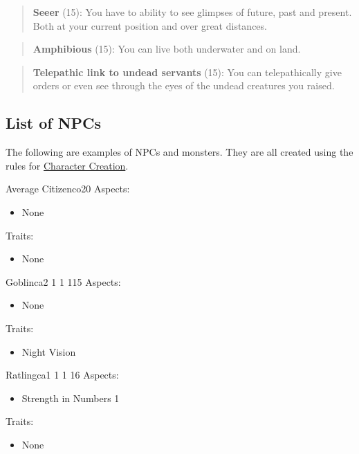 \documentclass[11pt]{article}
\begin{document}
{\begin{quote}
\textbf{Seeer} (15): You have to ability to see glimpses of future, past and present. Both at your current position and over great distances. 
\end{quote}

\begin{quote}
\textbf{Amphibious} (15): You can live both underwater and on land.
\end{quote}

\begin{quote}
\textbf{Telepathic link to undead servants} (15): You can telepathically give orders or even see through the eyes of the undead creatures you raised. 
\end{quote}
\subsection{List of NPCs}
\label{sec:org2c83388}
The following are examples of NPCs and monsters. They are all created using the rules for \hyperref[sec:org7863b9b]{Character Creation}. 

\begin{npc}{Average Citizen}{co}{2}{0}
Aspects:
\begin{itemize}
\item None
\end{itemize}
Traits:
\begin{itemize}
\item None
\end{itemize}
\end{npc}

\begin{npc}{Goblin}{ca}{2 1 1 1}{15}
Aspects:
\begin{itemize}
\item None
\end{itemize}
Traits:
\begin{itemize}
\item Night Vision
\end{itemize}
\end{npc}

\begin{npc}{Ratling}{ca}{1 1 1 1}{6}
Aspects:
\begin{itemize}
\item Strength in Numbers 1
\end{itemize}
Traits:
\begin{itemize}
\item None
\end{itemize}
\end{npc}

}
\end{document}
